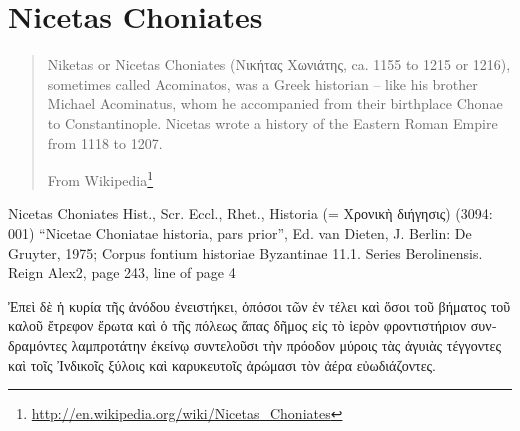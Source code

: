\documentclass[12pt,letterpaper,twoside,final]{memoir}
\begin{document}
\section{Nicetas Choniates}
\blockquote[From Wikipedia\footnote{\url{http://en.wikipedia.org/wiki/Nicetas_Choniates}}]{Niketas or Nicetas Choniates (Νικήτας Χωνιάτης, ca. 1155 to 1215 or 1216), sometimes called Acominatos, was a Greek historian – like his brother Michael Acominatus, whom he accompanied from their birthplace Chonae to Constantinople. Nicetas wrote a history of the Eastern Roman Empire from 1118 to 1207.}

\begin{greek}
Nicetas Choniates Hist., Scr. Eccl., Rhet., Historia (= Χρονικὴ διήγησις) (3094: 001)
“Nicetae Choniatae historia, pars prior”, Ed. van Dieten, J.
Berlin: De Gruyter, 1975; Corpus fontium historiae Byzantinae 11.1. Series Berolinensis.
Reign Alex2, page 243, line of page 4

Ἐπεὶ δὲ ἡ κυρία τῆς ἀνόδου ἐνειστήκει, ὁπόσοι τῶν ἐν τέλει καὶ ὅσοι 
τοῦ βήματος τοῦ καλοῦ ἔτρεφον ἔρωτα καὶ ὁ τῆς πόλεως ἅπας δῆμος εἰς 
τὸ ἱερὸν φροντιστήριον συνδραμόντες λαμπροτάτην ἐκείνῳ συντελοῦσι 
τὴν πρόοδον μύροις τὰς ἀγυιὰς τέγγοντες καὶ τοῖς Ἰνδικοῖς ξύλοις καὶ 
καρυκευτοῖς ἀρώμασι τὸν ἀέρα εὐωδιάζοντες. 

\end{greek}
\end{document}
